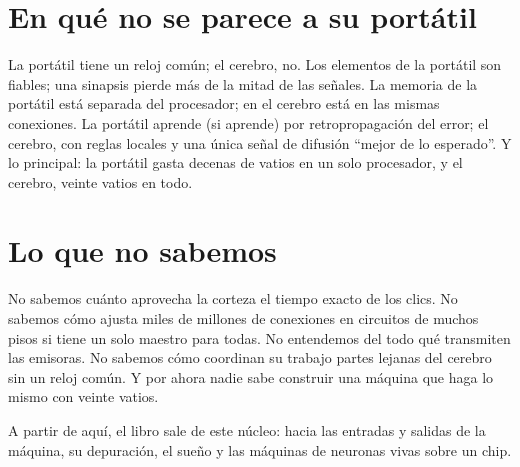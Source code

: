 \section*{En qué no se parece a su portátil}

La portátil tiene un reloj común; el cerebro, no. Los elementos de la portátil son fiables; una sinapsis pierde más de la mitad de las señales. La memoria de la portátil está separada del procesador; en el cerebro está en las mismas conexiones. La portátil aprende (si aprende) por retropropagación del error; el cerebro, con reglas locales y una única señal de difusión “mejor de lo esperado”. Y lo principal: la portátil gasta decenas de vatios en un solo procesador, y el cerebro, veinte vatios en todo.

\section*{Lo que no sabemos}

No sabemos cuánto aprovecha la corteza el tiempo exacto de los clics. No sabemos cómo ajusta miles de millones de conexiones en circuitos de muchos pisos si tiene un solo maestro para todas. No entendemos del todo qué transmiten las emisoras. No sabemos cómo coordinan su trabajo partes lejanas del cerebro sin un reloj común. Y por ahora nadie sabe construir una máquina que haga lo mismo con veinte vatios.

A partir de aquí, el libro sale de este núcleo: hacia las entradas y salidas de la máquina, su depuración, el sueño y las máquinas de neuronas vivas sobre un chip.

